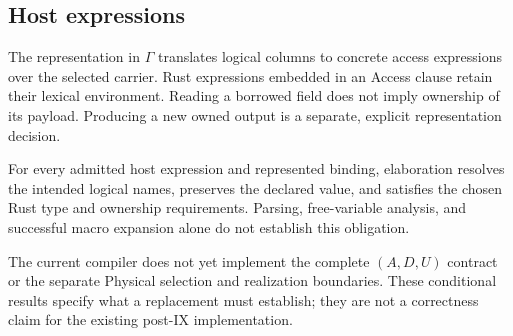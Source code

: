 \subsection{Host expressions}
\label{sec:host-elab}
The representation in $\Gamma$ translates logical columns to concrete access
expressions over the selected carrier.
Rust expressions embedded in an Access clause retain their lexical environment.
Reading a borrowed field does not imply ownership of its payload. Producing a
new owned output is a separate, explicit representation decision.
\begin{obligation}
For every admitted host expression and represented binding, elaboration resolves
the intended logical names, preserves the declared value, and satisfies the
chosen Rust type and ownership requirements. Parsing, free-variable analysis,
and successful macro expansion alone do not establish this obligation.
\end{obligation}

The current compiler does not yet implement the complete $(A,D,U)$ contract
or the separate Physical selection and realization boundaries.
These conditional results specify what a replacement must establish; they are
not a correctness claim for the existing post-IX implementation.
